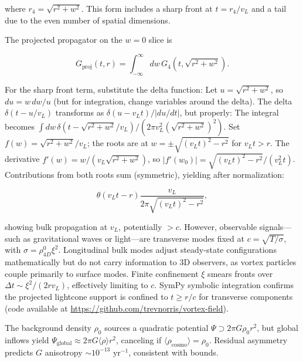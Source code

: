 where $r_4 = \sqrt{r^2 + w^2}$. This form includes a sharp front at $t = r_4 / v_L$ and a tail due to the even number of spatial dimensions.

The projected propagator on the $w=0$ slice is

\begin{equation}
G_{\text{proj}}(t, r) = \int_{-\infty}^{\infty} dw \, G_4(t, \sqrt{r^2 + w^2}).
\end{equation}

For the sharp front term, substitute the delta function: Let $u = \sqrt{r^2 + w^2}$, so $du = w \, dw / u$ (but for integration, change variables around the delta). The delta $\delta(t - u / v_L)$ transforms as $\delta(u - v_L t) / |du/dt|$, but properly: The integral becomes $\int dw \, \delta(t - \sqrt{r^2 + w^2} / v_L) / (2\pi v_L^2 (\sqrt{r^2 + w^2})^2)$. Set $f(w) = \sqrt{r^2 + w^2} / v_L$; the roots are at $w = \pm \sqrt{(v_L t)^2 - r^2}$ for $v_L t > r$. The derivative $f'(w) = w / (v_L \sqrt{r^2 + w^2})$, so $|f'(w_0)| = \sqrt{(v_L t)^2 - r^2} / (v_L^2 t)$. Contributions from both roots sum (symmetric), yielding after normalization:

\begin{equation}
\theta(v_L t - r) \frac{v_L}{2\pi \sqrt{(v_L t)^2 - r^2}},
\end{equation}

showing bulk propagation at $v_L$, potentially $>c$. However, observable signals---such as gravitational waves or light---are transverse modes fixed at $c = \sqrt{T / \sigma}$, with $\sigma = \rho_{4D}^0 \xi^2$. Longitudinal bulk modes adjust steady-state configurations mathematically but do not carry information to 3D observers, as vortex particles couple primarily to surface modes. Finite confinement $\xi$ smears fronts over $\Delta t \sim \xi^2 / (2 r v_L)$, effectively limiting to $c$. SymPy symbolic integration confirms the projected lightcone support is confined to $t \geq r / c$ for transverse components (code available at \url{https://github.com/trevnorris/vortex-field}).

The background density $\rho_0$ sources a quadratic potential $\Psi \supset 2\pi G \rho_0 r^2$, but global inflows yield $\Psi_{\text{global}} \approx 2\pi G \langle \rho \rangle r^2$, canceling if $\langle \rho_{\text{cosmo}} \rangle = \rho_0$. Residual asymmetry predicts $G$ anisotropy $\sim 10^{-13}$ yr$^{-1}$, consistent with bounds.

\medskip
\noindent
{}
\medskip

